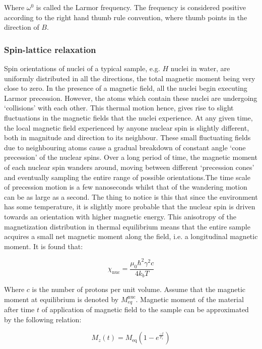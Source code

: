 		Where $\omega^{0}$ is called the Larmor frequency. The frequency
		is considered positive according to the right hand thumb rule convention,
		where thumb points in the direction of $B$. 


		\subsubsection{Spin-lattice relaxation}

		Spin orientations of nuclei of a typical sample, e.g. $H$ nuclei
		in water, are uniformly distributed in all the directions, the total
		magnetic moment being very close to zero. In the presence of a magnetic
		field, all the nuclei begin executing Larmor precession. However,
		the atoms which contain these nuclei are undergoing `collisions' with
		each other. This thermal motion hence, gives rise to slight fluctuations
		in the magnetic fields that the nuclei experience. At any given time,
		the local magnetic field experienced by anyone nuclear spin is slightly
		different, both in magnitude and direction to its neighbour. These
		small fluctuating fields due to neighbouring atoms cause a gradual
		breakdown of constant angle `cone precession' of the nuclear spins.
		Over a long period of time, the magnetic moment of each nuclear spin
		wanders around, moving between different `precession cones' and eventually
		sampling the entire range of possible orientations.The time scale
		of precession motion is a few nanoseconds whilst that of the wandering
		motion can be as large as a second. The thing to notice is this that
		since the environment has some temperature, it is slightly more probable
		that the nuclear spin is driven towards an orientation with higher
		magnetic energy. This anisotropy of the magnetization distribution
		in thermal equilibrium means that the entire sample acquires a small
		net magnetic moment along the field, i.e. a longitudinal magnetic
		moment. It is found that:

		\begin{equation}
		\chi_\text{nuc}=\frac{\mu_{0}\hbar^{2}\gamma^{2}c}{4k_{b}T}
		\end{equation}


		Where $c$ is the number of protons per unit volume. Assume that the
		magnetic moment at equilibrium is denoted by $M_{eq}^\text{nuc}.$ Magnetic
		moment of the material after time $t$ of application of magnetic
		field to the sample can be approximated by the following relation:

		\begin{equation}
		M_{z}(t)=M_\text{eq}(1-e^{\frac{-t}{T_{1}}})
		\end{equation}



